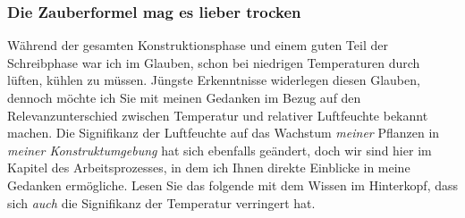 \documentclass[12pt,titlepage,a4paper]{article}
\begin{document}
\subsubsection{Die Zauberformel mag es lieber trocken}
Während der gesamten Konstruktionsphase und einem guten Teil der Schreibphase war ich im Glauben, schon bei niedrigen Temperaturen durch lüften, kühlen zu müssen. Jüngste Erkenntnisse widerlegen diesen Glauben, dennoch möchte ich Sie mit meinen Gedanken im Bezug auf den Relevanzunterschied zwischen Temperatur und relativer Luftfeuchte bekannt machen. Die Signifikanz der Luftfeuchte auf das Wachstum \textit{meiner} Pflanzen in \textit{meiner Konstruktumgebung} hat sich ebenfalls geändert, doch wir sind hier im Kapitel des Arbeitsprozesses, in dem ich Ihnen direkte Einblicke in meine Gedanken ermögliche. Lesen Sie das folgende mit dem Wissen im Hinterkopf, dass sich \textit{auch} die Signifikanz der Temperatur verringert hat.\\\\
\end{document}
